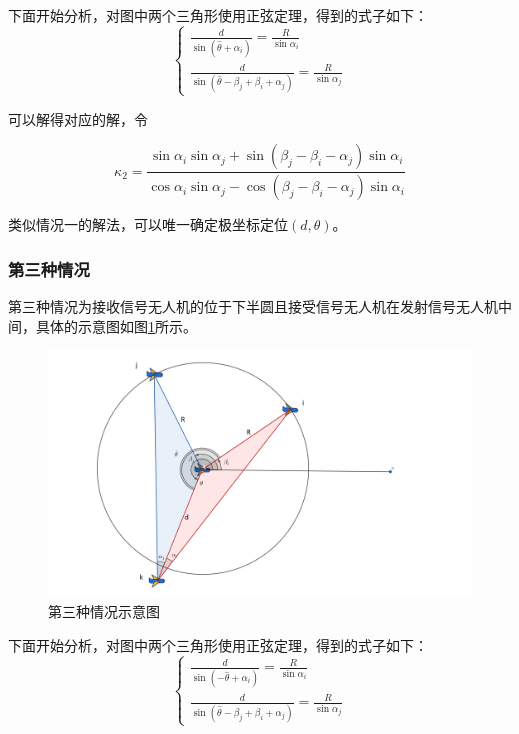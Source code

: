 \documentclass[withoutpreface,bwprint]{cumcmthesis} %
\begin{document}
下面开始分析，对图中两个三角形使用正弦定理，得到的式子如下：
\begin{equation}
\left\{\begin{array}{l}
\frac{d}{\sin \left(\hat{\theta} + \alpha_i\right)}=\frac{R}{\sin \alpha_i} \\
\frac{d}{\sin \left(\hat{\theta}- \beta_j + \beta_i  + \alpha_j \right)}=\frac{R}{\sin \alpha_j}
\end{array}\right.
\end{equation}

可以解得对应的解，令 

$$\kappa_2 = \frac{\sin \alpha_i \sin \alpha_j + \sin (\beta_j - \beta_i - \alpha_j) \sin \alpha_i}{\cos \alpha_i \sin \alpha_j - \cos(\beta_j - \beta_i - \alpha_j) \sin \alpha_i}$$

类似情况一的解法，可以唯一确定极坐标定位$(d,\theta)$。

\subsubsection{第三种情况}
第三种情况为接收信号无人机的位于下半圆且接受信号无人机在发射信号无人机中间，具体的示意图如图\ref{fig:case3}所示。

\begin{figure}[H]
    \centering
    \includegraphics[width=1.0\textwidth]{figures/case 3.png}
    \caption{第三种情况示意图}
    \label{fig:case3}
    
\end{figure}

下面开始分析，对图中两个三角形使用正弦定理，得到的式子如下：
\begin{equation}
\left\{\begin{array}{l}
\frac{d}{\sin \left(-\hat{\theta} + \alpha_i\right)}=\frac{R}{\sin \alpha_i} \\
\frac{d}{\sin \left(\hat{\theta} - \beta_j + \beta_i  + \alpha_j \right)}=\frac{R}{\sin \alpha_j}
\end{array}\right.
\end{equation}
\end{document}
